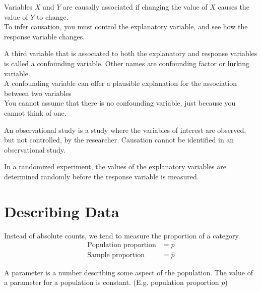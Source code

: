\documentclass[12pt]{article}
\begin{document}
\begin{tcolorbox}[title=Causation]
    Variables $X$ and $Y$ are causally associated if changing the value of $X$ causes the value of $Y$ to change.\\
    To infer causation, you must control the explanatory variable, and see how the response variable changes.
\end{tcolorbox}

\begin{tcolorbox}[title=Confounding Variable]
    A third variable that is associated to both the explanatory and response variables is called a confounding variable. Other names are confounding factor or lurking variable.\\
    A confounding variable can offer a plausible explanation for the association between two variables\\
    You cannot assume that there is no confounding variable, just because you cannot think of one.
\end{tcolorbox}

\begin{tcolorbox}[title=Observational Study]
    An observational study is a study where the variables of interest are observed, but not controlled, by the researcher. Causation cannot be identified in an observational study.
\end{tcolorbox}

\begin{tcolorbox}[title=Randomised Experiment]
    In a randomized experiment, the values of the explanatory variables are determined randomly before the response variable is measured.
\end{tcolorbox}

\pagebreak
\section{Describing Data}
\begin{tcolorbox}[title=Poportion]
    Instead of absolute counts, we tend to measure the proportion of a category.
    \begin{align*}
        \text{Population proportion} &= p\\
        \text{Sample proportion} &= \hat{p}
    \end{align*}
    
    
\end{tcolorbox}

\begin{tcolorbox}[title=Parameter]
    A parameter is a number describing some aspect of the population. The value of a parameter for a population is constant. (E.g. population proportion $p$)
\end{tcolorbox}
\end{document}
